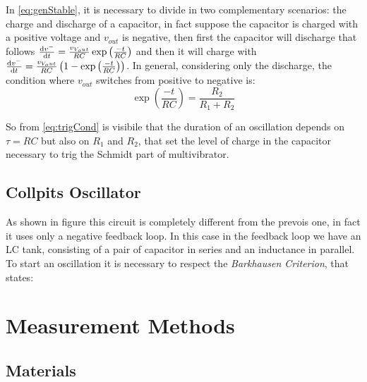 \documentclass[a4paper, twocolumn]{article}
\begin{document}
In \eqref{eq:genStable}, it is necessary to divide in two complementary scenarios: the charge and discharge of a capacitor, in fact suppose the capacitor is charged with a positive voltage and \(v_{out}\) is negative, then first the capacitor will discharge that follows \(\dv{v^-}{t}= \frac{v_{V_out}}{RC}\exp\left(\frac{-t}{RC}\right)\) and then it will charge with \(\dv{v^-}{t}= \frac{v_{V_out}}{RC}\left(1-\exp\left(\frac{-t}{RC}\right)\right)\). In general, considering only the discharge, the condition where \(v_{out}\) switches from positive to negative is:
\begin{equation}
    \label{eq:trigCond}
    \exp\left(\frac{-t}{RC}\right) = \frac{R_2}{R_1+R_2}
\end{equation}

So from \eqref{eq:trigCond} is visibile that the duration of an oscillation depends on \(\tau = RC\) but also on \(R_1\) and \(R_2\), that set the level of charge in the capacitor necessary to trig the Schmidt part of multivibrator.

\subsection{Collpits Oscillator}

\begin{figure}
    \centering
    \def \svgwidth{\columnwidth}
    
\end{figure}

As shown in figure this circuit is completely different from the prevois one, in fact it uses only a negative feedback loop. In this case in the feedback loop we have an LC tank, consisting of a pair of capacitor in series and an inductance in parallel. To start an oscillation it is necessary to respect the \emph{Barkhausen Criterion}, that states:

\section{Measurement Methods}
\subsection{Materials}
\end{document}
